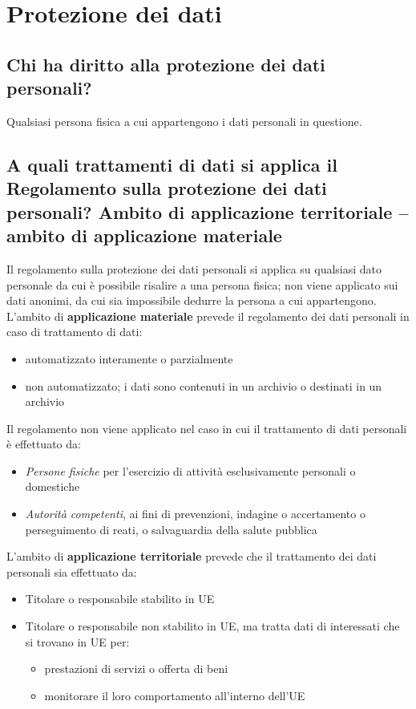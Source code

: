 \newpage
\section{Protezione dei dati}

\subsection{Chi ha diritto alla protezione dei dati personali?}
Qualsiasi persona fisica a cui appartengono i dati personali in questione.

\subsection{A quali trattamenti di dati si applica il Regolamento sulla protezione dei dati personali?
Ambito di applicazione territoriale – ambito di applicazione materiale}

Il regolamento sulla protezione dei dati personali si applica su qualsiasi dato personale da cui è possibile risalire a una persona fisica; non viene applicato sui dati anonimi, da cui sia impossibile dedurre la persona a cui appartengono.
\newline
L'ambito di \textbf{applicazione materiale} prevede il regolamento dei dati personali in caso di trattamento di dati:
\begin{itemize}
    \item automatizzato interamente o parzialmente
    \item non automatizzato; i dati sono contenuti in un archivio o destinati in un archivio
\end{itemize}
Il regolamento non viene applicato nel caso in cui il trattamento di dati personali è effettuato da:
\begin{itemize}
    \item \textit{Persone fisiche} per l'esercizio di attività esclusivamente personali o domestiche
    \item \textit{Autorità competenti}, ai fini di prevenzioni, indagine o accertamento o perseguimento di reati, o salvaguardia della salute pubblica
\end{itemize}
L'ambito di \textbf{applicazione territoriale} prevede che il trattamento dei dati personali sia effettuato da:
\begin{itemize}
    \item Titolare o responsabile stabilito in UE
    \item Titolare o responsabile non stabilito in UE, ma tratta dati di interessati che si trovano in UE per:
        \begin{itemize}
            \item  prestazioni di servizi o offerta di beni
            \item monitorare il loro comportamento all'interno dell'UE
        \end{itemize}
\end{itemize}

